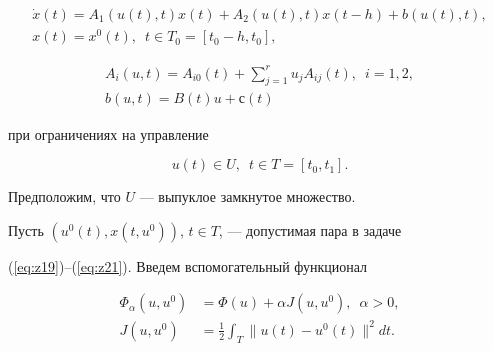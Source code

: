 \begin{equation}


\begin{array}{c}


\Dot{x}(t)=A_1(u(t),t)x(t)+A_2(u(t),t)x(t-h)+b(u(t),t), \\[3mm]


x(t)=x^0(t),\ \;t\in T_0=[t_0-h,t_0],


\end{array}


\label{eq:z20}


\end{equation}


\begin{gather*}


A_i(u,t)=A_{i0}(t)+\sum_{j=1}^{r}u_j A_{ij}(t),\ \; i=1,2, \\


b(u,t)=B(t)u+с(t)


\end{gather*}


при ограничениях на управление


\begin{equation}


u(t)\in U,\ \;t\in T=[t_0,t_1].


\label{eq:z21}


\end{equation}





Предположим, что $U$ --- выпуклое замкнутое множество.





Пусть $(u^0(t),x(t,u^0))$, $t\in T$, --- допустимая пара в задаче


(\ref{eq:z19})--(\ref{eq:z21}). Введем вспомогательный функционал


\begin{equation}


\begin{split}


\Phi_\alpha(u,u^0)&=\Phi(u)+\alpha J(u,u^0),\ \;\alpha>0, \\


J(u,u^0)&=\frac{1}{2}\int_T\|u(t)-u^0(t)\|^2 dt.


\label{eq:z22}


\end{split}


\end{equation}


